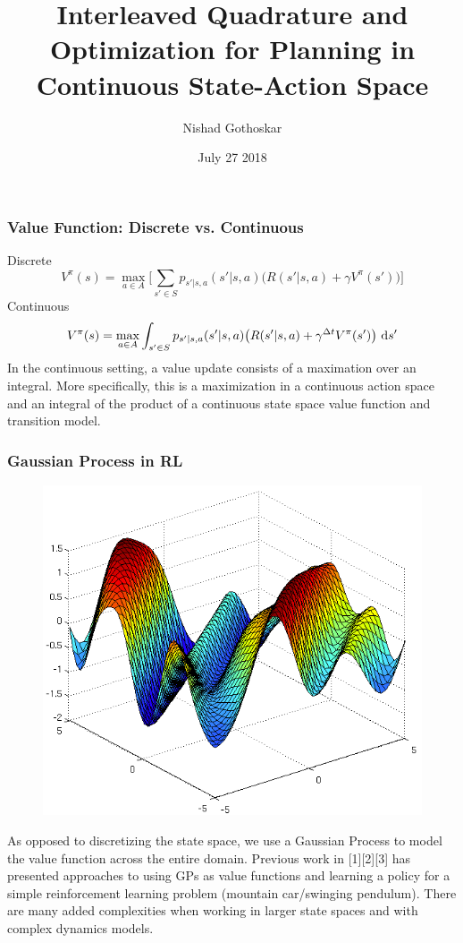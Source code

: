 \documentclass[8pt]{beamer}
\title{Interleaved Quadrature and Optimization for Planning in Continuous State-Action Space}
\author{Nishad Gothoskar}
\institute{LIS}
\date{July 27 2018}
\begin{document}
 
\frame{\titlepage}
 
\begin{frame}
\frametitle{Value Function: Discrete vs. Continuous}
Discrete
\begin{equation*}    %
        V^{\pi}(s) = \max_{a \in A} \Big[\sum_{s' \in S} p_{s'|s,a}(s'|s,a)\big(R(s'|s,a) + \gamma V^{\pi}(s')\big) \Big]
\end{equation*}
Continuous
\begin{equation*}    %
        V^{\pi}(s) = \max_{a \in A} \int_{s' \in S} p_{s'|s,a}(s'|s,a)\big(R(s'|s,a) + \gamma^{\Delta t}V^{\pi}(s')\big) \ \textup{d}s'
\end{equation*}
\newline
In the continuous setting, a value update consists of a maximation over an integral.  More specifically, this is a maximization in a continuous action space and an integral of the product of a continuous state space value function and transition model.
\end{frame}

\begin{frame}
\frametitle{Gaussian Process in RL}
\begin{figure}
\includegraphics[scale=0.15]{gp}
\end{figure}
As opposed to discretizing the state space, we use a Gaussian Process to model the value function across the entire domain. Previous work in [1][2][3] has presented approaches to using GPs as value functions and learning a policy for a simple reinforcement learning problem (mountain car/swinging pendulum). There are many added complexities when working in larger state spaces and with complex dynamics models.
\newline  \newline

\end{frame}
\end{document}
